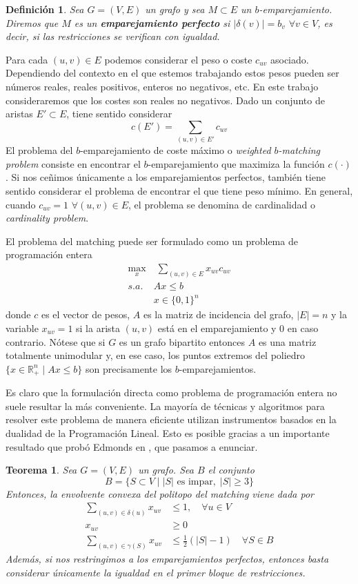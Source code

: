 \documentclass[twoside,a4paper,openright,12pt,tikz]{book}
\newtheorem{defi}{Definici\'on}[section]
\newtheorem{thm}{Teorema}[section]
\newcommand{\R}{\mathbb{R}}
\begin{document}
\begin{defi}
Sea $G=(V,E)$ un grafo y sea $M\subset E$ un $b$-emparejamiento. Diremos que $M$ es un \textbf{emparejamiento perfecto} si $|\delta(v)|=b_v$ $\forall v \in V$, es decir, si las restricciones se verifican con igualdad.
\end{defi}
Para cada $(u,v)\in E$ podemos considerar el peso o coste $c_{uv}$ asociado. Dependiendo del contexto en el que estemos trabajando estos pesos pueden ser números reales, reales positivos, enteros no negativos, etc. En este trabajo consideraremos que los costes son reales no negativos. Dado un conjunto de aristas $E'\subset E$, tiene sentido considerar
$$
c(E')=\sum_{(u,v)\in E'} c_{uv}
$$
El problema del $b$-emparejamiento de coste máximo o \textit{weighted $b$-matching problem} consiste en encontrar el $b$-emparejamiento que maximiza la función $c(\cdot)$. Si nos ceñimos únicamente a los emparejamientos perfectos, también tiene sentido considerar el problema de encontrar el que tiene peso mínimo. En general, cuando $c_{uv}=1$ $\forall (u,v)\in E$, el problema se denomina de cardinalidad o \textit{cardinality problem}.

El problema del matching puede ser formulado como un problema de programación entera
\begin{align*}
\max_{x} &\; \sum_{(u,v)\in E} x_{uv}c_{uv}  \nonumber\\ 
s.a.\;  &  Ax\leq b \\
& x\in\{0,1\}^n\nonumber
\end{align*}
donde $c$ es el vector de pesos, $A$ es la matriz de incidencia del grafo, $|E|=n$ y la variable $x_{uv}=1$ si la arista $(u,v)$ está en el emparejamiento y $0$ en caso contrario. Nótese que si $G$ es un grafo bipartito entonces $A$ es una matriz totalmente unimodular y, en ese caso, los puntos extremos del poliedro $\{x \in \R^n_+\mid Ax\leq b\}$ son precisamente los $b$-emparejamientos.

Es claro que la formulación directa como problema de programación entera no suele resultar la más conveniente. La mayoría de técnicas y algoritmos para resolver este problema de manera eficiente utilizan instrumentos basados en la dualidad de la Programación Lineal. Esto es posible gracias a un importante resultado que probó Edmonds en \cite{edmond}, que pasamos a enunciar.
\begin{thm}
Sea $G=(V,E)$ un grafo. Sea $B$ el conjunto
$$
B = \{S\subset V \mid |S| \text{ es impar},\;|S|\geq 3\}
$$
Entonces, la envolvente convexa del politopo del matching viene dada por
\begin{align*}
\sum_{(u,v)\in\delta(u)} x_{uv} &\leq 1, \quad \forall u\in V\\
x_{uv} &\geq 0\\
\sum_{(u,v)\in \gamma(S)} x_{uv}& \leq \frac{1}{2}(|S|-1)\quad \forall S \in B	
\end{align*}
Además, si nos restringimos a los emparejamientos perfectos, entonces basta considerar únicamente la igualdad en el primer bloque de restricciones.
\end{thm}
\end{document}
